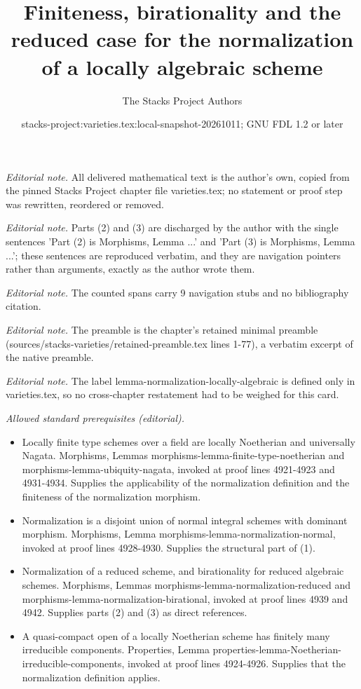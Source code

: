 \documentclass[10pt,a4paper]{amsart}
\title{Finiteness, birationality and the reduced case for the normalization of a locally algebraic scheme}
\author{The Stacks Project Authors}
\date{stacks-project:varieties.tex:local-snapshot-20261011; GNU FDL 1.2 or later}
\theoremstyle{plain}
\theoremstyle{definition}
\theoremstyle{remark}
\numberwithin{equation}{subsection}
\begin{document}
\maketitle
\noindent\textit{Editorial note.} All delivered mathematical text is the author's own, copied from the pinned Stacks Project chapter file varieties.tex; no statement or proof step was rewritten, reordered or removed.\par\medskip
\noindent\textit{Editorial note.} Parts (2) and (3) are discharged by the author with the single sentences 'Part (2) is Morphisms, Lemma ...' and 'Part (3) is Morphisms, Lemma ...'; these sentences are reproduced verbatim, and they are navigation pointers rather than arguments, exactly as the author wrote them.\par\medskip
\noindent\textit{Editorial note.} The counted spans carry 9 navigation stubs and no bibliography citation.\par\medskip
\noindent\textit{Editorial note.} The preamble is the chapter's retained minimal preamble (sources/stacks-varieties/retained-preamble.tex lines 1-77), a verbatim excerpt of the native preamble.\par\medskip
\noindent\textit{Editorial note.} The label lemma-normalization-locally-algebraic is defined only in varieties.tex, so no cross-chapter restatement had to be weighed for this card.\par\medskip
\noindent\textit{Allowed standard prerequisites (editorial).}\begin{itemize}
\item Locally finite type schemes over a field are locally Noetherian and universally Nagata. Morphisms, Lemmas morphisms-lemma-finite-type-noetherian and morphisms-lemma-ubiquity-nagata, invoked at proof lines 4921-4923 and 4931-4934. Supplies the applicability of the normalization definition and the finiteness of the normalization morphism.
\item Normalization is a disjoint union of normal integral schemes with dominant morphism. Morphisms, Lemma morphisms-lemma-normalization-normal, invoked at proof lines 4928-4930. Supplies the structural part of (1).
\item Normalization of a reduced scheme, and birationality for reduced algebraic schemes. Morphisms, Lemmas morphisms-lemma-normalization-reduced and morphisms-lemma-normalization-birational, invoked at proof lines 4939 and 4942. Supplies parts (2) and (3) as direct references.
\item A quasi-compact open of a locally Noetherian scheme has finitely many irreducible components. Properties, Lemma properties-lemma-Noetherian-irreducible-components, invoked at proof lines 4924-4926. Supplies that the normalization definition applies.
\end{itemize}\medskip
\end{document}
